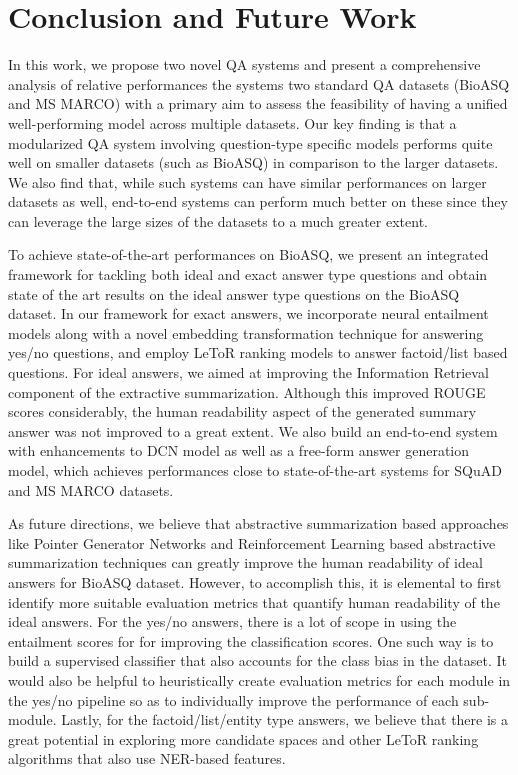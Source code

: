 
\section{Conclusion and Future Work}
\label{future}

In this work, we propose two novel QA systems and present a comprehensive analysis of relative performances the systems two standard QA datasets (BioASQ and MS MARCO) with a primary aim to assess the feasibility of having a unified well-performing model across multiple datasets. Our key finding is that a modularized QA system involving question-type specific models performs quite well on smaller datasets (such as BioASQ) in comparison to the larger datasets. We also find that, while such systems can have similar performances on larger datasets as well, end-to-end systems can perform much better on these since they can leverage the large sizes of the datasets to a much greater extent. 

To achieve state-of-the-art performances on BioASQ, we present an integrated framework for tackling both ideal and exact answer type questions and obtain state of the art results on the ideal answer type questions on the BioASQ dataset. In our framework for exact answers, we incorporate neural entailment models along with a novel embedding transformation technique for answering yes/no questions, and employ LeToR ranking models to answer factoid/list based questions. For ideal answers, we aimed at improving the Information Retrieval component of the extractive summarization. Although this improved ROUGE scores considerably, the human readability aspect of the generated summary answer was not improved to a great extent. We also build an end-to-end system with enhancements to DCN model as well as a free-form answer generation model, which achieves performances close to state-of-the-art systems for SQuAD and MS MARCO datasets.

As future directions, we believe that abstractive summarization based approaches like Pointer Generator Networks \cite{PGC} and Reinforcement Learning based abstractive summarization techniques \cite{salesforce} can greatly improve the human readability of ideal answers for BioASQ dataset. However, to accomplish this, it is elemental to first identify more suitable evaluation metrics that quantify human readability of the ideal answers. For the yes/no answers, there is a lot of scope in using the entailment scores for for improving the classification scores. One such way is to build a supervised classifier that also accounts for the class bias in the dataset. It would also be helpful to heuristically create evaluation metrics for each module in the yes/no pipeline so as to individually improve the performance of each sub-module. Lastly, for the factoid/list/entity type answers, we believe that there is a great potential in exploring more candidate spaces and other LeToR ranking algorithms that also use NER-based features. 


